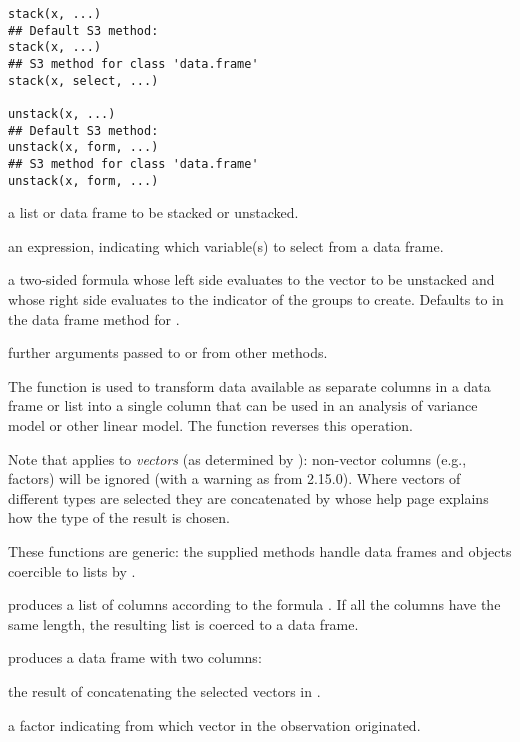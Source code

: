%
\begin{Usage}
\begin{verbatim}
stack(x, ...)
## Default S3 method:
stack(x, ...)
## S3 method for class 'data.frame'
stack(x, select, ...)

unstack(x, ...)
## Default S3 method:
unstack(x, form, ...)
## S3 method for class 'data.frame'
unstack(x, form, ...)
\end{verbatim}
\end{Usage}
%
\begin{Arguments}
\begin{ldescription}
\item[\code{x}] a list or data frame to be stacked or unstacked.
\item[\code{select}] an expression, indicating which variable(s) to select from a
data frame.
\item[\code{form}] a two-sided formula whose left side evaluates to the
vector to be unstacked and whose right side evaluates to the
indicator of the groups to create.  Defaults to 
in the data frame method for .
\item[\code{...}] further arguments passed to or from other methods.
\end{ldescription}
\end{Arguments}
%
\begin{Details}\relax
The  function is used to transform data available as
separate columns in a data frame or list into a single column that can
be used in an analysis of variance model or other linear model.  The
 function reverses this operation.

Note that  applies to \emph{vectors} (as determined by
): non-vector columns (e.g., factors) will be
ignored (with a warning as from \R{} 2.15.0).  Where vectors of
different types are selected they are concatenated by
 whose help page explains how the type of the
result is chosen.

These functions are generic: the supplied methods handle data frames
and objects coercible to lists by .
\end{Details}
%
\begin{Value}
 produces a list of columns according to the formula
.  If all the columns have the same length, the resulting
list is coerced to a data frame.

 produces a data frame with two columns:
\begin{ldescription}
\item[\code{values}] the result of concatenating the selected vectors in
.
\item[\code{ind}] a factor indicating from which vector in  the
observation originated.
\end{ldescription}
\end{Value}

